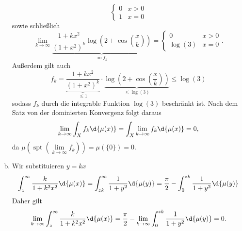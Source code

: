 \documentclass{article}
\begin{document}
\begin{enumerate}[(a)]
\[\begin{cases}
                0 &x > 0\\
                1 &x = 0
            \end{cases}
        \]
        sowie schließlich
        \[
            \lim\limits_{k \to \infty} \underbrace{\frac{1 + kx^2}{(1+x^2)^k} \log\left(2 + \cos\left(\frac{x}{k}\right)\right)}_{\eqqcolon f_k} = \begin{cases}
                0 & x > 0\\
                \log(3) & x = 0
            \end{cases}.
        \]
        Außerdem gilt auch 
        \[
            f_k = \underbrace{\frac{1 + kx^2}{(1+x^2)^k}}_{\leq 1} \cdot \underbrace{\log\left(2 + \cos\left(\frac{x}{k}\right)\right)}_{\leq \log(3)} \leq \log(3)
        \]
        sodass $f_k$ durch die integrable Funktion $\log(3)$ beschränkt ist. Nach dem Satz von der dominierten Konvergenz folgt daraus 
        \[
            \lim\limits_{k \to \infty} \int_X f_k \d{\mu(x)}
            = \int_X \lim\limits_{k \to \infty} f_k \d{\mu(x)}
            = 0,
        \]
        da $\mu(\operatorname{spt}(\lim\limits_{k \to \infty} f_k)) = \mu(\{0\}) = 0$.
        \item Wir substituieren $y = kx$
        \[
            \int_z^\infty \frac{k}{1 + k^2x^2} \d{\mu(x)} = \int_{zk}^\infty \frac{1}{1 + y^2}\d{\mu(y)} = \frac{\pi}{2} - \int_{0}^{zk} \frac{1}{1 + y^2}\d{\mu(y)}
        \]
        Daher gilt
        \[
              \lim\limits_{k \to \infty} \int_z^\infty \frac{k}{1 + k^2x^2} \d{\mu(x)} = \frac{\pi}{2} - \lim\limits_{k \to \infty} \int_{0}^{zk} \frac{1}{1 + y^2}\d{\mu(y)} = 0.
        \]
    \end{enumerate}
\end{document}
